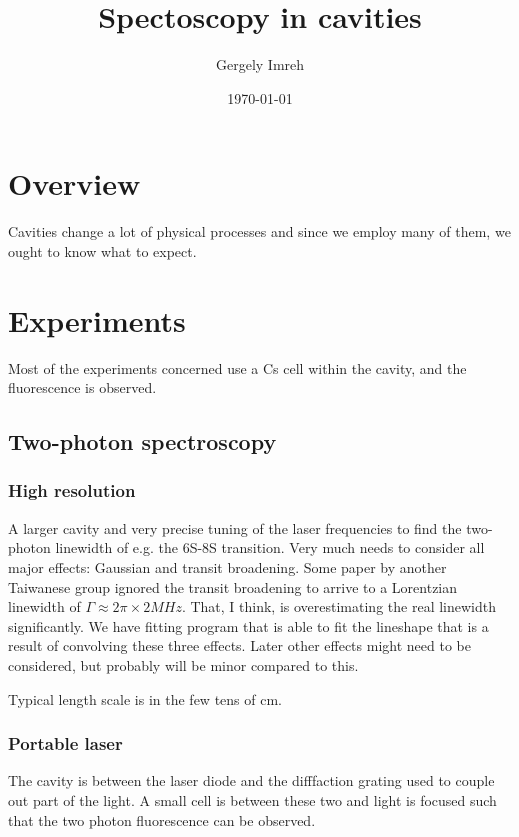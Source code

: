 \documentclass[11pt,a4paper]{article}
\title{Spectoscopy in cavities}
\author{Gergely Imreh}
\date{\today}
\begin{document}
\maketitle
\section{Overview}

Cavities change a lot of physical processes and since we employ many of them, we ought to know what to expect.

\section{Experiments}

Most of the experiments concerned use a Cs cell within the cavity, and the fluorescence is observed.

\subsection{Two-photon spectroscopy}


\subsubsection{High resolution}

A larger cavity and very precise tuning of the laser frequencies to find the two-photon linewidth of e.g. the 6S-8S transition. Very much needs to consider all major effects: Gaussian and transit broadening. Some paper by another Taiwanese group ignored the transit broadening to arrive to a Lorentzian linewidth of $\Gamma \approx 2 \pi \times 2 MHz$. That, I think, is overestimating the real linewidth significantly. We have fitting program that is able to fit the lineshape that is a result of convolving these three effects. Later other effects might need to be considered, but probably will be minor compared to this. 

Typical length scale is in the few tens of cm.

\subsubsection{Portable laser}

The cavity is between the laser diode and the difffaction grating used to couple out part of the light. A small cell is between these two and light is focused such that the two photon fluorescence can be observed.
\end{document}
